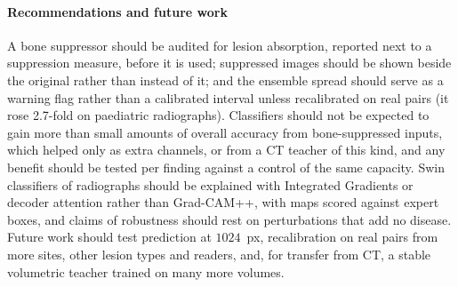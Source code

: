 \paragraph{Recommendations and future work} A bone suppressor should be audited for lesion absorption, reported next to a suppression
measure, before it is used; suppressed images should be shown beside the original rather than instead of it; and the ensemble spread should
serve as a warning flag rather than a calibrated interval unless recalibrated on real pairs (it rose 2.7-fold on paediatric radiographs).
Classifiers should not be expected to gain more than small amounts of overall accuracy from bone-suppressed inputs, which helped only as
extra channels, or from a CT teacher of this kind, and any benefit should be tested per finding against a control of the same capacity. Swin classifiers of radiographs should be explained with Integrated
Gradients or decoder attention rather than Grad-CAM++, with maps scored against expert boxes, and claims of robustness should rest on
perturbations that add no disease. Future work should test prediction at $1024$~px, recalibration on real pairs from more sites, other
lesion types and readers, and, for transfer from CT, a stable volumetric teacher trained on many more volumes.
